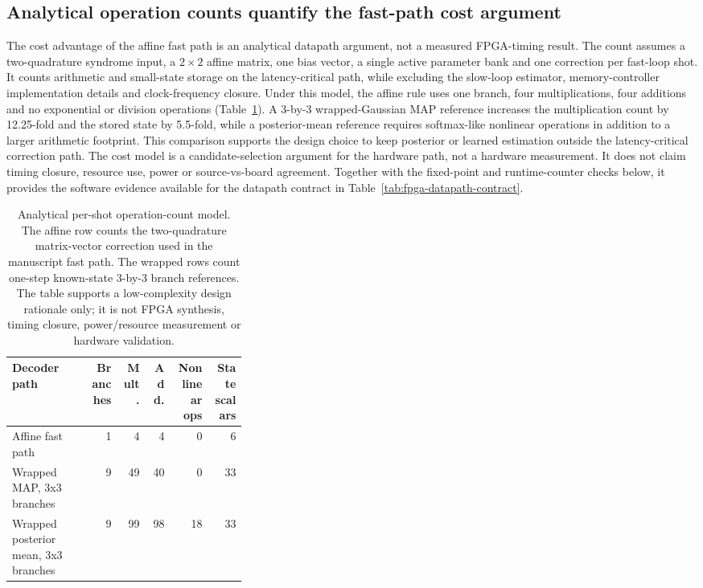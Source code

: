 \documentclass[11pt]{article}
\begin{document}
\subsection{Analytical operation counts quantify the fast-path cost argument}

The cost advantage of the affine fast path is an analytical datapath argument,
not a measured FPGA-timing result.  The count assumes a two-quadrature
syndrome input, a \(2\times 2\) affine matrix, one bias vector, a single active
parameter bank and one correction per fast-loop shot.  It counts arithmetic and
small-state storage on the latency-critical path, while excluding the slow-loop
estimator, memory-controller implementation details and clock-frequency
closure.  Under this model, the affine rule uses one branch, four
multiplications, four additions and no exponential or division operations
(Table~\ref{tab:fast-path-cost-model}).  A 3-by-3 wrapped-Gaussian MAP
reference increases the multiplication count by 12.25-fold and the stored
state by 5.5-fold, while a posterior-mean reference requires softmax-like
nonlinear operations in addition to a larger arithmetic footprint.  This
comparison supports the design choice to keep posterior or learned estimation
outside the latency-critical correction path.  The cost model is a
candidate-selection argument for the hardware path, not a hardware
measurement.  It does not claim timing closure, resource use, power or
source-vs-board agreement.  Together with
the fixed-point and runtime-counter checks below, it provides the software
evidence available for the datapath contract in
Table~\ref{tab:fpga-datapath-contract}.

\begin{table}[t]
\centering
\small
\begin{tabular}{@{}>{\raggedright\arraybackslash}p{0.34\linewidth}rrrrr@{}}
\toprule
Decoder path & Branches & Mult. & Add. & Nonlinear ops & State scalars \\
\midrule
Affine fast path & 1 & 4 & 4 & 0 & 6 \\
Wrapped MAP, 3x3 branches & 9 & 49 & 40 & 0 & 33 \\
Wrapped posterior mean, 3x3 branches & 9 & 99 & 98 & 18 & 33 \\
\bottomrule
\end{tabular}
\caption{Analytical per-shot operation-count model.  The affine row counts the
two-quadrature matrix-vector correction used in the manuscript fast path.  The
wrapped rows count one-step known-state 3-by-3 branch references.  The table
supports a low-complexity design rationale only; it is not FPGA synthesis,
timing closure, power/resource measurement or hardware validation.}
\label{tab:fast-path-cost-model}
\end{table}
\end{document}
